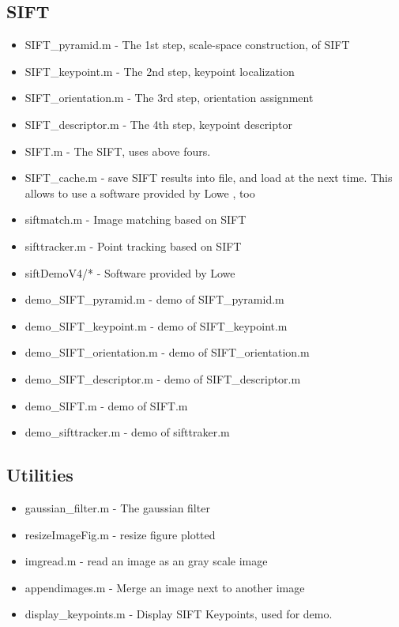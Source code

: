 \documentclass{article}
\begin{document}
\subsection{SIFT}
\begin{itemize}
\item SIFT\_pyramid.m - The 1st step, scale-space construction, of SIFT
\item SIFT\_keypoint.m - The 2nd step, keypoint localization
\item SIFT\_orientation.m - The 3rd step, orientation assignment
\item SIFT\_descriptor.m - The 4th step, keypoint descriptor
\item SIFT.m - The SIFT, uses above fours. 
\item SIFT\_cache.m - save SIFT results into file, and load at the next time. This allows to use a software provided by Lowe \cite{dLowe05}, too
\item siftmatch.m - Image matching based on SIFT
\item sifttracker.m - Point tracking based on SIFT
\item siftDemoV4/* - Software provided by Lowe \cite{dLowe05}
\item demo\_SIFT\_pyramid.m - demo of SIFT\_pyramid.m
\item demo\_SIFT\_keypoint.m - demo of SIFT\_keypoint.m
\item demo\_SIFT\_orientation.m - demo of SIFT\_orientation.m
\item demo\_SIFT\_descriptor.m - demo of SIFT\_descriptor.m
\item demo\_SIFT.m - demo of SIFT.m
\item demo\_sifttracker.m - demo of sifttraker.m
\end{itemize}

\subsection{Utilities}
\begin{itemize}
\item gaussian\_filter.m - The gaussian filter
\item resizeImageFig.m - resize figure plotted
\item imgread.m - read an image as an gray scale image
\item appendimages.m - Merge an image next to another image
\item display\_keypoints.m - Display SIFT Keypoints, used for demo.
\end{itemize}
\end{document}
